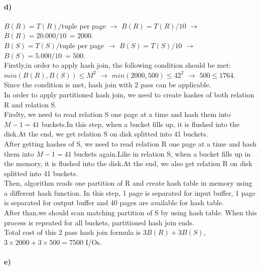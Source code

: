 \documentclass[a4paper,12pt]{article}
\begin{document}
\paragraph{d)}

\begin{tcolorbox}
$B(R) = T(R)/$tuple per page $\rightarrow$ $B(R) = T(R)/10$ $\rightarrow$ $B(R) = 20.000/10\ = 2000$. \\
$B(S) = T(S)/$tuple per page $\rightarrow$ $B(S) = T(S)/10$ $\rightarrow$ $B(S) = 5.000/10\ = 500$.\\
Firstly,in order to apply hash join, the following condition should be met:\\
$min(B(R),B(S))\leq M^2$ $\rightarrow$ $min(2000,500)\leq 42^2$ $\rightarrow$ $500\leq 1764$.\\
Since the condition is met, hash join with 2 pass can be applicable.\\
In order to apply partitioned hash join, we need to create hashes of both relation R and relation S.\\
Firslty, we need to read relation S one page at a time and hash them into $M-1=41$ buckets.In this step, when a bucket fills up, it is flushed into the disk.At the end, we get relation S on disk splitted into 41 buckets.\\
After getting hashes of S, we need to read relation R one page at a time and hash them into $M-1=41$ buckets again.Like in relation S, when a bucket fills up in the memory, it is flushed into the disk.At the end, we also get relation R on disk splitted into 41 buckets.\\
Then, algorithm reads one partition of R and create hash table in memory using a different hash function. In this step, 1 page is separated for input buffer, 1 page is separated for output buffer and 40 pages are available for hash table.\\
After than,we should scan matching partition of S by using hash table. When this process is repeated for all buckets, partitioned hash join ends.\\ 
Total cost of this 2 pass hash join formula is $3B(R) + 3B(S)$,\\
$3\times 2000 + 3 \times 500 = 7500$
I/Os.
\end{tcolorbox}

\paragraph{e)}
\end{document}
